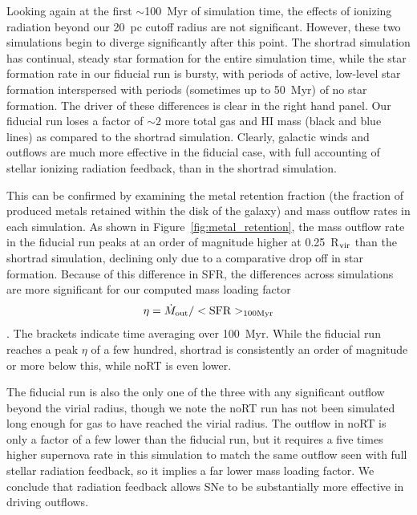 \documentclass[twocolumn]{aastex62}
\begin{document}
{Looking again at the first $\sim$100~Myr of simulation time, the effects of ionizing radiation beyond our 20~pc cutoff radius are not significant. However, these two simulations begin to diverge significantly after this point. The shortrad simulation has continual, steady star formation for the entire simulation time, while the star formation rate in our fiducial run is bursty, with periods of active, low-level star formation interspersed with periods (sometimes up to 50~Myr) of no star formation. The driver of these differences is clear in the right hand panel. Our fiducial run loses a factor of $\sim 2$ more total gas and HI mass (black and blue lines) as compared to the shortrad simulation. Clearly, galactic winds and outflows are much more effective in the fiducial case, with full accounting of stellar ionizing radiation feedback, than in the shortrad simulation.

This can be confirmed by examining the metal retention fraction (the fraction of produced metals retained within the disk of the galaxy) and mass outflow rates in each simulation. As shown in Figure~\ref{fig:metal_retention}, the mass outflow rate in the fiducial run peaks at an order of magnitude higher at 0.25~R$_{\rm vir}$ than the shortrad simulation, declining only due to a comparative drop off in star formation. Because of this difference in SFR, 
the differences across simulations are more significant for our computed mass loading factor 
\begin{equation}
    \eta = \dot{M}_{\rm out} / <\rm{SFR}>_{100 \rm{Myr}}
\end{equation}. The brackets indicate time averaging over 100~Myr.
%
While the fiducial run reaches a peak $\eta$ of a few hundred, shortrad is consistently an order of magnitude or more below this, while noRT is even lower. 

The fiducial run is also the only one of the three with any significant outflow beyond the virial radius, though we note the noRT run has not been simulated long enough for gas to have reached the virial radius. The outflow in noRT is 
   only a factor of a few lower than 
the fiducial run, but it requires a five times higher supernova rate in this simulation to match the same outflow seen with full stellar radiation feedback, 
    so it implies a far lower mass loading factor. 
We conclude that radiation feedback allows SNe to be substantially more effective in driving outflows. 

}
\end{document}
